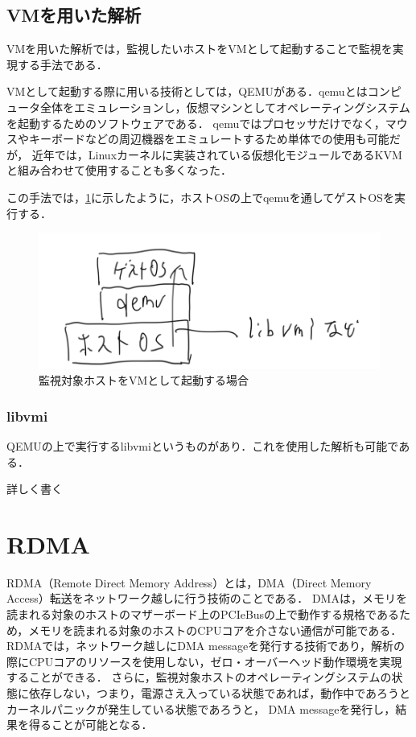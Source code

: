 \subsection{VMを用いた解析}

VMを用いた解析では，監視したいホストをVMとして起動することで監視を実現する手法である．

VMとして起動する際に用いる技術としては，QEMU\cite{qemu}がある．qemuとはコンピュータ全体をエミュレーションし，仮想マシンとしてオペレーティングシステムを起動するためのソフトウェアである．
qemuではプロセッサだけでなく，マウスやキーボードなどの周辺機器をエミュレートするため単体での使用も可能だが，
近年では，Linuxカーネルに実装されている仮想化モジュールであるKVM\cite{kvm}と組み合わせて使用することも多くなった．

この手法では，\ref{fig:vm_arch}に示したように，ホストOSの上でqemuを通してゲストOSを実行する．

\begin{figure}[htbp]
    \caption{監視対象ホストをVMとして起動する場合}
    \label{fig:vm_arch}
    \begin{center}
        \includegraphics[bb=0 0 1000 340,width=15cm]{img/tegaki/01_vm.png}
    \end{center}
\end{figure}

\subsubsection{libvmi}

QEMUの上で実行するlibvmi\cite{osti_1334968}というものがあり．これを使用した解析も可能である．

詳しく書く

\section{RDMA}

RDMA（Remote Direct Memory Address）とは，DMA（Direct Memory Access）\cite{amini1995system}転送をネットワーク越しに行う技術のことである．
DMAは，メモリを読まれる対象のホストのマザーボード上のPCIeBusの上で動作する規格であるため，メモリを読まれる対象のホストのCPUコアを介さない通信が可能である．
RDMAでは，ネットワーク越しにDMA messageを発行する技術であり，解析の際にCPUコアのリソースを使用しない，ゼロ・オーバーヘッド動作環境を実現することができる．
さらに，監視対象ホストのオペレーティングシステムの状態に依存しない，つまり，電源さえ入っている状態であれば，動作中であろうとカーネルパニックが発生している状態であろうと，
DMA messageを発行し，結果を得ることが可能となる．

